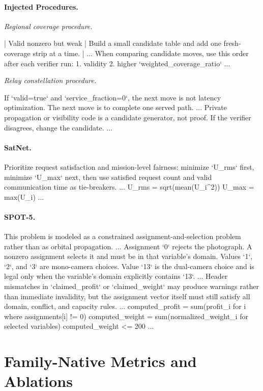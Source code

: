 \documentclass[11pt]{article}
\newenvironment{promptblockcompact}
  {\VerbatimEnvironment\par\smallskip\Needspace{6\baselineskip}\noindent\begin{promptblockinnercompact}}
  {\end{promptblockinnercompact}\par\smallskip}
\newcommand{\promptheadingcompact}[1]{\Needspace{4\baselineskip}\paragraph{#1}\mbox{}\par}
\begin{document}
\promptheadingcompact{Injected Procedures.}
\emph{Regional coverage procedure.}
\begin{promptblockcompact}
| Valid nonzero but weak | Build a small candidate table and add one
fresh-coverage strip at a time. |
...
When comparing candidate moves, use this order after each verifier run:
1. validity
2. higher `weighted_coverage_ratio`
...
\end{promptblockcompact}

\emph{Relay constellation procedure.}
\begin{promptblockcompact}
If `valid=true` and `service_fraction=0`, the next move is not latency
optimization. The next move is to complete one served path.
...
Private propagation or visibility code is a candidate generator, not proof. If
the verifier disagrees, change the candidate.
...
\end{promptblockcompact}

\promptheadingcompact{SatNet.}
\begin{promptblockcompact}
Prioritize request satisfaction and mission-level fairness: minimize `U_rms`
first, minimize `U_max` next, then use satisfied request count and valid
communication time as tie-breakers.
...
U_rms = sqrt(mean(U_i^2))
U_max = max(U_i)
...
\end{promptblockcompact}

\promptheadingcompact{SPOT-5.}
\begin{promptblockcompact}
This problem is modeled as a constrained assignment-and-selection problem
rather than as orbital propagation.
...
Assignment `0` rejects the photograph. A nonzero assignment selects it and
must be in that variable's domain. Values `1`, `2`, and `3` are mono-camera
choices. Value `13` is the dual-camera choice and is legal only when the
variable's domain explicitly contains `13`.
...
Header mismatches in `claimed_profit` or `claimed_weight` may produce warnings
rather than immediate invalidity, but the assignment vector itself must still
satisfy all domain, conflict, and capacity rules.
...
computed_profit = sum(profit_i for i where assignments[i] != 0)
computed_weight = sum(normalized_weight_i for selected variables)
computed_weight <= 200
...
\end{promptblockcompact}

\clearpage
\section{Family-Native Metrics and Ablations}
\label{app:ablation-results}
\end{document}
